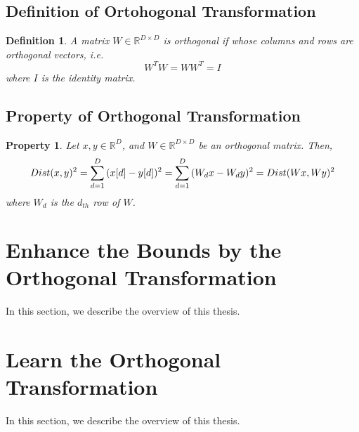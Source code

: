 \subsection{Definition of Ortohogonal Transformation}
\label{ss:ortho_def}
\newtheorem{Orthogonal}{\bf Definition}
\begin{Orthogonal}
A matrix $W \in\mathbb{R}^{D\times D}$ is orthogonal if whose columns and rows are orthogonal vectors, i.e.
\[
W^{T}W=WW^{T}=I
\]
where $I$ is the identity matrix.
\end{Orthogonal}

\subsection{Property of Orthogonal Transformation}
\label{ss:ortho_prop}
\newtheorem{ProOfOrthogonal}{\bf Property}
\begin{ProOfOrthogonal}
Let $x, y\in\mathbb{R}^{D}$, and $W\in\mathbb{R}^{D\times D}$ be an orthogonal matrix. Then,
\[
Dist(x,y)^2=\sum^D_{d=1}{(x[d]-y[d])^2} \\
=\sum^D_{d=1}{(W_dx-W_dy)^2}=Dist(Wx,Wy)^2
\]
where $W_d$ is the $d_{th}$ row of $W$.
\end{ProOfOrthogonal}

\section{Enhance the Bounds by the Orthogonal Transformation}
\label{s:ortho_bounds}
In this section, we describe the overview of this thesis.

\section{Learn the Orthogonal Transformation}
\label{s:ortho_learn}
In this section, we describe the overview of this thesis.



%
%